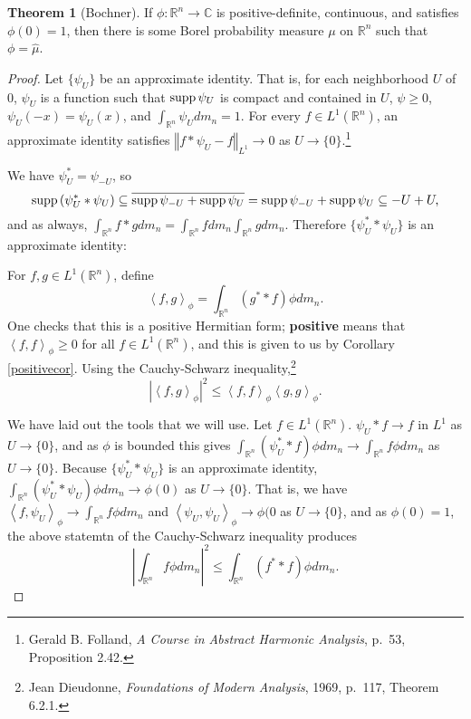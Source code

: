 \documentclass{article}
\newcommand{\inner}[2]{\left\langle #1, #2 \right\rangle}
\newcommand{\supp}{\ensuremath\mathrm{supp}\,}
\newcommand{\norm}[1]{\left\Vert #1 \right\Vert}
\theoremstyle{definition}
\newtheorem{theorem}{Theorem}
\theoremstyle{definition}
\begin{document}
\begin{theorem}[Bochner]
If $\phi:\mathbb{R}^n \to \mathbb{C}$ is positive-definite, continuous, and satisfies $\phi(0)=1$, then there is some
Borel probability measure $\mu$ on $\mathbb{R}^n$ such that $\phi=\hat{\mu}$.
\end{theorem}
\begin{proof}
Let $\{\psi_U\}$ be an approximate identity. That is, for each  neighborhood $U$ of $0$, $\psi_U$ is a function such that
$\supp \psi_U$ is compact and contained in $U$,
$\psi \geq
0$,
$\psi_U(-x)=\psi_U(x)$, and  $\int_{\mathbb{R}^n} \psi_U dm_n =1$. For every $f \in L^1(\mathbb{R}^n)$, an approximate identity satisfies $\norm{f*\psi_U -f}_{L^1}\to 0$ as
$U \to \{0\}$.\footnote{Gerald B. Folland, {\em A Course in Abstract Harmonic Analysis}, p.~53, Proposition 2.42.}

We have $\psi_U^*=\psi_{-U}$, so
\[
\supp (\psi_U^* * \psi_U) \subseteq \overline{\supp \psi_{-U} + \supp \psi_U} = \supp \psi_{-U} + \supp \psi_U \subseteq -U +U,
\]
and as always, $\int_{\mathbb{R}^n} f*g dm_n
=\int_{\mathbb{R}^n} f dm_n \int_{\mathbb{R}^n} gdm_n$.
Therefore $\{\psi_U^* * \psi_U\}$ is an approximate identity:

For $f,g \in L^1(\mathbb{R}^n)$, define
\[
\inner{f}{g}_\phi = \int_{\mathbb{R}^n} (g^* * f) \phi dm_n.
\]
One checks that this is a positive Hermitian form; \textbf{positive} means that $\inner{f}{f}_\phi \geq 0$ for all $f \in L^1(\mathbb{R}^n)$, and this
is given to us by Corollary \ref{positivecor}.
Using the Cauchy-Schwarz inequality,\footnote{Jean Dieudonne, {\em Foundations of Modern Analysis}, 1969, p.~117, Theorem 6.2.1.}
\[
|\inner{f}{g}_\phi|^2 \leq \inner{f}{f}_\phi \inner{g}{g}_\phi.
\]

We have  laid out the tools that we will use. Let $f \in L^1(\mathbb{R}^n)$. $\psi_U * f  \to f$ in $L^1$ as $U \to \{0\}$, and as $\phi$ is bounded
this gives $\int_{\mathbb{R}^n} (\psi_U^* * f) \phi dm_n \to \int_{\mathbb{R}^n} f\phi dm_n$ as $U \to \{0\}$. 
Because $\{\psi_U^* * \psi_U\}$ is an approximate identity, $\int_{\mathbb{R}^n} (\psi_U^* * \psi_U) \phi dm_n \to \phi(0)$ as $U \to \{0\}$. That is,
we have $\inner{f}{\psi_U}_\phi \to \int_{\mathbb{R}^n} f\phi dm_n$ and $\inner{\psi_U}{\psi_U}_\phi \to \phi(0$ as $U \to \{0\}$, and as $\phi(0)=1$,
the above statemtn of the Cauchy-Schwarz inequality produces
\begin{equation}
\left| \int_{\mathbb{R}^n} f\phi dm_n \right|^2 \leq \int_{\mathbb{R}^n} (f^* * f)\phi dm_n.
\label{sweetestimate}
\end{equation}


\end{proof}
\end{document}
